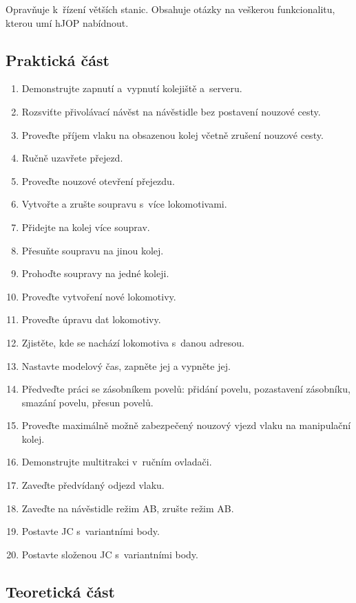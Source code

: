 \documentclass[12pt,a4paper]{article}
\begin{document}
Opravňuje k~řízení větších stanic. Obsahuje otázky na veškerou funkcionalitu,
kterou umí hJOP nabídnout.

\subsection{Praktická část}

\begin{enumerate}[leftmargin=*]
\item Demonstrujte zapnutí a~vypnutí kolejiště a~serveru.
\item Rozsviťte přivolávací návěst na návěstidle bez postavení nouzové cesty.
\item Proveďte příjem vlaku na obsazenou kolej včetně zrušení nouzové cesty.
\item Ručně uzavřete přejezd.
\item Proveďte nouzové otevření přejezdu.
\item Vytvořte a zrušte soupravu s~více lokomotivami.
\item Přidejte na kolej více souprav.
\item Přesuňte soupravu na jinou kolej.
\item Prohoďte soupravy na jedné koleji.
\item Proveďte vytvoření nové lokomotivy.
\item Proveďte úpravu dat lokomotivy.
\item Zjistěte, kde se nachází lokomotiva s~danou adresou.
\item Nastavte modelový čas, zapněte jej a vypněte jej.
\item Předveďte práci se zásobníkem povelů: přidání povelu, pozastavení
zásobníku, smazání povelu, přesun povelů.
\item Proveďte maximálně možně zabezpečený nouzový vjezd vlaku na manipulační
kolej.
\item Demonstrujte multitrakci v~ručním ovladači.
\item Zaveďte předvídaný odjezd vlaku.
\item Zaveďte na návěstidle režim AB, zrušte režim AB.
\item Postavte JC s~variantními body.
\item Postavte složenou JC s~variantními body.
\end{enumerate}

\newpage
\subsection{Teoretická část}
\end{document}
